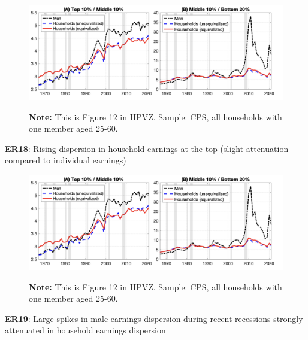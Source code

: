\documentclass[11pt, aspectratio=169]{beamer}
\begin{document}
\begin{frame}{}
	\begin{figure}
		\includegraphics[scale=0.35]{./figures/inequality_household_1}
	\vspace*{-4mm}
	\begin{flushleft}
		{\scriptsize \hspace{6mm} \textbf{Note:} This is Figure 12 in HPVZ. Sample: CPS, all households with one member aged 25-60.}
	\end{flushleft}	
	\end{figure}

	\vspace{0mm}
	{\color{blue}\textbf{ER18}}: Rising dispersion in household earnings at the top (slight attenuation compared to individual earnings)
\end{frame}


\begin{frame}{}
	\begin{figure}
		\includegraphics[scale=0.35]{./figures/inequality_household_1}
	\vspace*{-4mm}
	\begin{flushleft}
		{\scriptsize \hspace{6mm} \textbf{Note:} This is Figure 12 in HPVZ. Sample: CPS, all households with one member aged 25-60.}
	\end{flushleft}	
	\end{figure}

	\vspace{0mm}
	{\color{blue}\textbf{ER19}}: Large spikes in male earnings dispersion during recent recessions strongly attenuated in household earnings dispersion
\end{frame}
\end{document}
